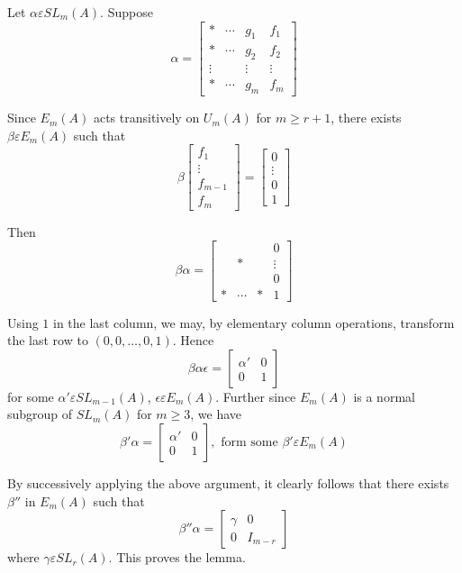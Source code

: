 \begin{Proof}
Let $\alpha \varepsilon SL_m(A)$. Suppose
$$
\alpha=
\begin{bmatrix}
\ast & \cdots & g_1 & f_1\\
\ast & \cdots & g_2 & f_2\\
\vdots & & \vdots & \vdots\\
\ast & \cdots & g_m & f_m
\end{bmatrix}
$$

Since $E_m(A)$ acts transitively on $U_m(A)$ for $m\geq r+1$, there
exists $\beta \varepsilon E_m(A)$ such that 
$$
\beta
\begin{bmatrix}
f_1\\
\vdots\\
f_{m-1}\\
f_m
\end{bmatrix} = \begin{bmatrix}
0\\
\vdots\\
0\\
1
\end{bmatrix}
$$

Then
$$
\beta\alpha=
\begin{bmatrix}
& & & 0\\
& \ast &  &\vdots\\
& & & 0\\
\ast & \cdots & \ast & 1
\end{bmatrix}
$$

Using $1$ in the last column, we may, by elementary column operations,
transform the last row to $(0,0,\ldots,0,1)$. Hence
$$
\beta\alpha\epsilon=
\begin{bmatrix}
\alpha' & 0\\
0 & 1
\end{bmatrix}
$$
for some $\alpha' \varepsilon SL_{m-1}(A)$, $\epsilon \varepsilon
E_m(A)$. Further since $E_m(A)$ is a normal subgroup of $SL_m(A)$ for
$m\geq 3$, we have 
$$
\beta'\alpha=
\begin{bmatrix}
\alpha'& 0\\
0 & 1
\end{bmatrix}, \text{ form some } \beta' \varepsilon E_m(A)
$$

By successively applying the above argument, it clearly follows that
there exists $\beta''$ in $E_m(A)$ such that 
$$
\beta''\alpha=
\begin{bmatrix}
\gamma & 0\\
0 &I_{m-r}
\end{bmatrix}
$$
where $\gamma \varepsilon SL_r(A)$. This proves the lemma.
\enprf
\end{Proof}


